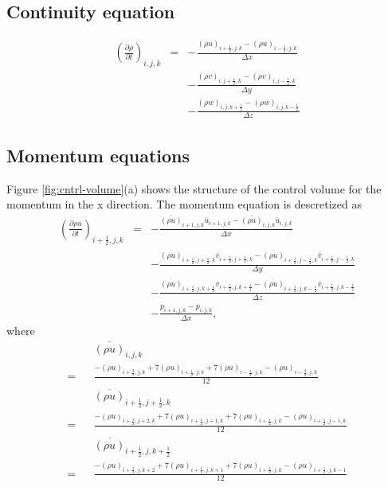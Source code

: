 \subsection{Continuity equation}
\begin{eqnarray}
\left(\frac{\partial \rho}{\partial t}\right)_{i,j,k}
&=& - \frac{(\rho u)_{i+\frac{1}{2},j,k} -(\rho u)_{i-\frac{1}{2},j,k}}{\Delta x}\nonumber\\
& & - \frac{(\rho v)_{i,j+\frac{1}{2},k} -(\rho v)_{i,j-\frac{1}{2},k}}{\Delta y}\nonumber\\
& & - \frac{(\rho w)_{i,j,k+\frac{1}{2}} -(\rho w)_{i,j,k-\frac{1}{2}}}{\Delta z}
\end{eqnarray}

\subsection{Momentum equations}
Figure \ref{fig:cntrl-volume}(a) shows the structure of the control volume for the momentum
in the x direction.
The momentum equation is descretized as
\begin{eqnarray}
\left(\frac{\partial \rho u}{\partial t}\right)_{i+\frac{1}{2},j,k}
&=& - \frac{\overline{(\rho u)}_{i+1,j,k} \overline{u}_{i+1,j,k} 
           -\overline{(\rho u)}_{i,j,k} \overline{u}_{i,j,k}}
     {\Delta x}\nonumber\\
& & - \frac{\overline{(\rho u)}_{i+\frac{1}{2},j+\frac{1}{2},k}  \overline{v}_{i+\frac{1}{2},j+\frac{1}{2},k} 
           -\overline{(\rho u)}_{i+\frac{1}{2},j-\frac{1}{2},k}  \overline{v}_{i+\frac{1}{2},j-\frac{1}{2},k}}
     {\Delta y}\nonumber\\
& & - \frac{\overline{(\rho u)}_{i+\frac{1}{2},j,k+\frac{1}{2}}  \overline{v}_{i+\frac{1}{2},j,k+\frac{1}{2}} 
           -\overline{(\rho u)}_{i+\frac{1}{2},j,k-\frac{1}{2}}  \overline{v}_{i+\frac{1}{2},j,k-\frac{1}{2}}}
     {\Delta z}\nonumber\\
& & -\frac{p_{i+1,j,k}-p_{i,j,k}}{\Delta x},
\end{eqnarray}
where 
\begin{eqnarray}
&& \overline{(\rho u)}_{i,j,k} \nonumber\\
= && \frac{-(\rho u)_{i+\frac{3}{2},j,k}+7(\rho u)_{i+\frac{1}{2},j,k}+7(\rho u)_{i-\frac{1}{2},j,k}-(\rho u)_{i-\frac{3}{2},j,k}}{12}\\
&& \overline{(\rho u)}_{i+\frac{1}{2},j+\frac{1}{2},k} \nonumber\\
= && \frac{-(\rho u)_{i+\frac{1}{2},j+2,k}+7(\rho u)_{i+\frac{1}{2},j+1,k}+7(\rho u)_{i+\frac{1}{2},j,k}-(\rho u)_{i+\frac{1}{2},j-1,k}}{12}\\
&& \overline{(\rho u)}_{i+\frac{1}{2},j,k+\frac{1}{2}} \nonumber\\
= &&\frac{-(\rho u)_{i+\frac{1}{2},j,k+2}+7(\rho u)_{i+\frac{1}{2},j,k+1}+7(\rho u)_{i+\frac{1}{2},j,k}-(\rho u)_{i+\frac{1}{2},j,k-1}}{12}
\end{eqnarray}

